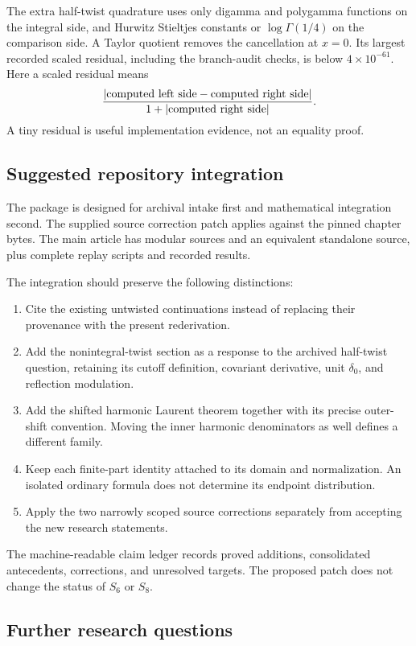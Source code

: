 The extra half-twist quadrature uses only digamma and polygamma
functions on the integral side, and Hurwitz Stieltjes constants or
\(\log\Gamma(1/4)\) on the comparison side. A Taylor quotient removes
the cancellation at \(x=0\). Its largest recorded scaled residual,
including the branch-audit checks, is below \(4\times10^{-61}\).
Here a scaled residual means
\[
 \frac{|\hbox{computed left side}-\hbox{computed right side}|}
      {1+|\hbox{computed right side}|}.
\]
A tiny residual is useful implementation evidence, not an equality proof.

\subsection{Suggested repository integration}

The package is designed for archival intake first and mathematical
integration second. The supplied source correction patch applies
against the pinned chapter bytes. The main article has modular
sources and an equivalent standalone source, plus complete replay
scripts and recorded results.

The integration should preserve the following distinctions:
\begin{enumerate}[leftmargin=1.6em]
\item Cite the existing untwisted continuations instead of replacing
      their provenance with the present rederivation.
\item Add the nonintegral-twist section as a response to the archived
      half-twist question, retaining its cutoff definition, covariant
      derivative, unit \(\delta_0\), and reflection modulation.
\item Add the shifted harmonic Laurent theorem together with its
      precise outer-shift convention. Moving the inner harmonic
      denominators as well defines a different family.
\item Keep each finite-part identity attached to its domain and
      normalization. An isolated ordinary formula does not determine
      its endpoint distribution.
\item Apply the two narrowly scoped source corrections separately
      from accepting the new research statements.
\end{enumerate}
The machine-readable claim ledger records proved additions,
consolidated antecedents, corrections, and unresolved targets.
The proposed patch does not change the status of \(S_6\) or \(S_8\).

\subsection{Further research questions}

